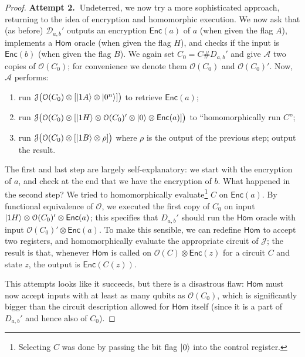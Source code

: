 \documentclass[envcountsame]{llncs}
\numberwithin{equation}{section}
\newcommand{\algo}{\mathcal}
\newcommand{\Enc}{\ensuremath{\mathsf{Enc}}\xspace}
\newcommand{\Homorcl}{\ensuremath{\mathsf{Hom}}\xspace}
\begin{document}
\begin{proof}
\textbf{Attempt 2.~}Undeterred, we now try a more sophisticated approach, returning to the idea of encryption and homomorphic execution. We now ask that (as before) $\mathcal D_{a, b}'$ outputs an encryption $\Enc(a)$ of $a$ (when given the flag $A$), implements a $\Homorcl$ oracle (when given the flag $H$), and checks if the input is $\Enc(b)$ (when given the flag $B$). We again set $C_0 = C \# D_{a, b}'$ and give $\algo A$ two copies of $\algo O(C_0)$; for convenience we denote them $\algo O(C_0)$ and $\algo O(C_0)'$. Now, $\algo A$ performs: 
\begin{enumerate}
\item run $\algo J \bigl( \algo O(C_0) \otimes [\ket{1A} \otimes \ket{0^n}]\bigr)$ to retrieve $\Enc(a)$;
\item run $\algo J \bigl( \algo O(C_0) \otimes [\ket{1H} \otimes \algo O(C_0)' \otimes \ket{0} \otimes \Enc(a)]\bigr)$ to ``homomorphically run $C$'';
\item run $\algo J \bigl( \algo O(C_0) \otimes [\ket{1B} \otimes \rho]\bigr)$ where $\rho$ is the output of the previous step; output the result.
\end{enumerate}
The first and last step are largely self-explanatory: we start with the encryption of $a$, and check at the end that we have the encryption of $b$. What happened in the second step? We tried to homomorphically evaluate\footnote{Selecting $C$ was done by passing the bit flag ${\left\vert{0}\right\rangle}$ into the control register.} $C$ on $\Enc(a)$. By functional equivalence of $\algo O$, we executed the first copy of $C_0$ on input $\ket{1H} \otimes \algo O(C_0)' \otimes \Enc(a)$; this specifies that $D_{a, b}'$ should run the $\Homorcl$ oracle with input $\mathcal O(C_0)' \otimes \Enc(a)$. To make this sensible, we can redefine $\Homorcl$ to accept two registers, and homomorphically evaluate the appropriate circuit of $\algo J$; the result is that, whenever $\Homorcl$ is called on $\mathcal O(C) \otimes \Enc(z)$ for a circuit $C$ and state $z$, the output is $\Enc(C(z))$.

This attempts looks like it succeeds, but there is a disastrous flaw: $\Homorcl$ must now accept inputs with at least as many qubits as $\algo O(C_0)$, which is significantly bigger than the circuit description allowed for $\Homorcl$ itself (since it is a part of $D_{a, b}'$ and hence also of $C_0$).


\end{proof}
\end{document}
